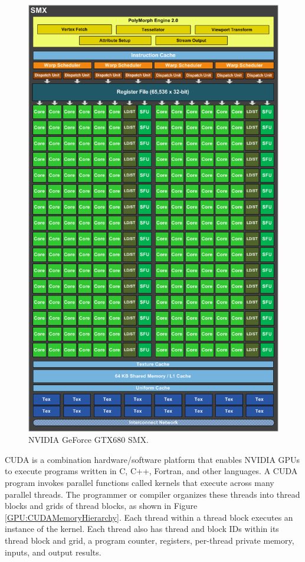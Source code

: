 \begin{figure}
\centering
\includegraphics[width=\textwidth]{GPU/GeForceGTX680SMX.png}
\caption{NVIDIA GeForce GTX680 SMX.}
\label{GPU:GeForceGTX680SMX}
\end{figure}

CUDA is a combination hardware/software platform that enables NVIDIA GPUs to execute programs written in C, C++, Fortran, and other languages. A CUDA program invokes parallel functions called kernels that execute across many parallel threads. The programmer or compiler organizes these threads into thread blocks and grids of thread blocks, as shown in Figure \ref{GPU:CUDAMemoryHierarchy}. Each thread within a thread block executes an instance of the kernel. Each thread also has thread and block IDs within its thread block and grid, a program counter, registers, per-thread private memory, inputs, and output results.

